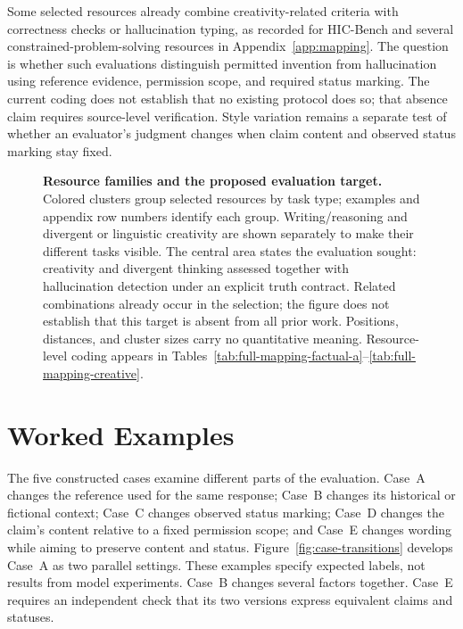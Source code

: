 \documentclass{clv2025}
\begin{document}
Some selected resources already combine creativity-related criteria with
correctness checks or hallucination typing, as recorded for HIC-Bench and
several constrained-problem-solving resources in Appendix~\ref{app:mapping}.
The question is whether such evaluations distinguish permitted invention
from hallucination using reference evidence, permission scope, and required
status marking. The current coding does not establish that no existing
protocol does so; that absence claim requires source-level verification.
Style variation remains a separate test of whether an evaluator's judgment
changes when claim content and observed status marking stay fixed.

\begin{figure}[!ht]
\centering
\resizebox{\textwidth}{!}{}
\caption{\textbf{Resource families and the proposed evaluation target.}
Colored clusters group selected resources by task type; examples and appendix
row numbers identify each group. Writing/reasoning and divergent or linguistic creativity
are shown separately to make their different tasks visible.
The central area states the evaluation sought: creativity and divergent
thinking assessed together with hallucination detection under an explicit
truth contract. Related combinations already occur in the selection; the
figure does not establish that this target is absent from all prior work.
Positions, distances, and cluster sizes carry no quantitative meaning.
Resource-level coding appears in
Tables~\ref{tab:full-mapping-factual-a}--\ref{tab:full-mapping-creative}.}
\label{fig:profiles}
\end{figure}
\FloatBarrier

\section{Worked Examples}\label{sec:cases}

The five constructed cases examine different parts of the evaluation.
Case~A changes the reference used for the same response; Case~B changes its
historical or fictional context; Case~C changes observed status marking;
Case~D changes the claim's content relative to a fixed permission scope;
and Case~E changes wording while aiming to preserve content and status.
Figure~\ref{fig:case-transitions} develops Case~A as two parallel settings.
These examples specify expected labels, not results from model experiments.
Case~B changes several factors together. Case~E requires an independent
check that its two versions express equivalent claims and statuses.
\end{document}
